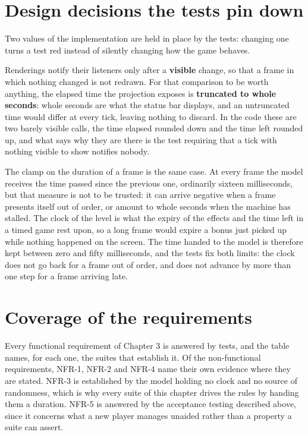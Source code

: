 \section{Design decisions the tests pin down}

Two values of the implementation are held in place by the tests: changing one turns a test red instead of silently
changing how the game behaves.

Renderings notify their listeners only after a \textbf{visible} change, so that a frame in which nothing changed is not
redrawn. For that comparison to be worth anything, the elapsed time the projection exposes is \textbf{truncated to whole
seconds}: whole seconds are what the status bar displays, and an untruncated time would differ at every tick, leaving
nothing to discard. In the code these are two barely visible calls, the time elapsed rounded down and the time left
rounded up, and what says why they are there is the test requiring that a tick with nothing visible to show notifies
nobody.

The clamp on the duration of a frame is the same case. At every frame the model receives the time passed since the
previous one, ordinarily sixteen milliseconds, but that measure is not to be trusted: it can arrive negative when a
frame presents itself out of order, or amount to whole seconds when the machine has stalled. The clock of the level is
what the expiry of the effects and the time left in a timed game rest upon, so a long frame would expire a bonus just
picked up while nothing happened on the screen. The time handed to the model is therefore kept between zero and fifty
milliseconds, and the tests fix both limits: the clock does not go back for a frame out of order, and does not advance
by more than one step for a frame arriving late.

\section{Coverage of the requirements}

Every functional requirement of Chapter 3 is answered by tests, and the table names, for each one, the suites that
establish it. Of the non-functional requirements, NFR-1, NFR-2 and NFR-4 name their own evidence where they are stated.
NFR-3 is established by the model holding no clock and no source of randomness, which is why every suite of this
chapter drives the rules by handing them a duration. NFR-5 is answered by the acceptance testing described above,
since it concerns what a new player manages unaided rather than a property a suite can assert.

